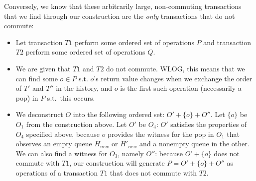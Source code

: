 \noindent Conversely, we know that these arbitrarily large, non-commuting transactions that we find through our construction are the \emph{only} transactions that do not commute: 
\begin{itemize}
    \item Let transaction $T1$ perform some ordered set of operations $P$ and transaction $T2$ perform some ordered set of operations $Q$.
    \item We are given that $T1$ and $T2$ do not commute. WLOG, this means that we can find some $o \in P$ s.t. $o$'s return value changes when we exchange the order of $T'$ and $T''$ in the history, and $o$ is the first such operation (necessarily a pop) in $P$ s.t.\ this occurs.
    \item We deconstruct $O$ into the following ordered set: $O' + \{o\} + O''$. Let $\{o\}$ be $O_1$ from the construction above. 
        Let $O'$ be $O_4$: $O'$ satisfies the properties of $O_4$ specified above, because $o$ provides the witness for the pop in $O_1$ that observes an empty queue $H_{new}$ or $H'_{new}$ and a nonempty queue in the other. We can also find a witness for $O_3$, namely $O''$: because $O' + \{o\}$ does not commute with $T1$, our construction will generate $P = O' + \{o\} + O''$ as operations of a transaction $T1$ that does not commute with $T2$.
\end{itemize}

